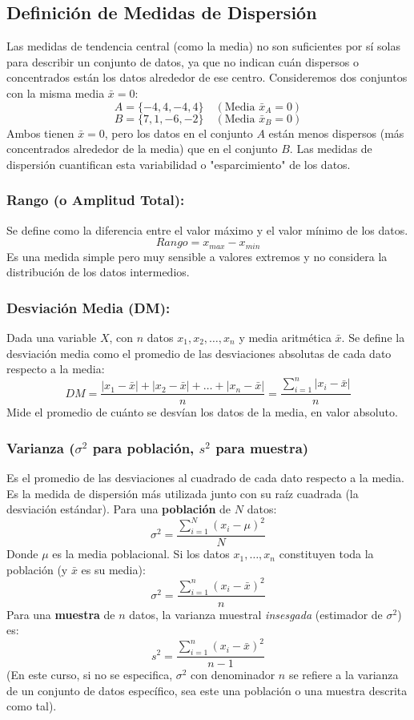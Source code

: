\documentclass[12pt, letterpaper]{article}
\begin{document}
\subsection{Definición de Medidas de Dispersión}
Las medidas de tendencia central (como la media) no son suficientes por sí solas para describir un conjunto de datos, ya que no indican cuán dispersos o concentrados están los datos alrededor de ese centro. Consideremos dos conjuntos con la misma media $\bar{x}=0$:
\[ A = \{-4, 4, -4, 4\} \quad (\text{Media } \bar{x}_A = 0) \]
\[ B = \{7, 1, -6, -2\} \quad (\text{Media } \bar{x}_B = 0) \]
Ambos tienen $\bar{x}=0$, pero los datos en el conjunto $A$ están menos dispersos (más concentrados alrededor de la media) que en el conjunto $B$. Las medidas de dispersión cuantifican esta variabilidad o "esparcimiento" de los datos.

\subsubsection{Rango (o Amplitud Total):}
Se define como la diferencia entre el valor máximo y el valor mínimo de los datos.
\[ Rango = x_{max} - x_{min} \]
Es una medida simple pero muy sensible a valores extremos y no considera la distribución de los datos intermedios.

\subsubsection{Desviación Media (DM):}
Dada una variable $X$, con $n$ datos $x_1, x_2, \dots, x_n$ y media aritmética $\bar{x}$. Se define la desviación media como el promedio de las desviaciones absolutas de cada dato respecto a la media:
\[ DM = \frac{|x_1-\bar{x}|+|x_2-\bar{x}|+\dots+|x_n-\bar{x}|}{n} = \frac{\sum_{i=1}^{n} |x_i - \bar{x}|}{n} \]
Mide el promedio de cuánto se desvían los datos de la media, en valor absoluto.

\subsubsection{\texorpdfstring{Varianza ($\sigma^2$ para población, $s^2$ para muestra)}{Varianza (sigma-cuadrado para población, s-cuadrado para muestra)}}
Es el promedio de las desviaciones al cuadrado de cada dato respecto a la media. Es la medida de dispersión más utilizada junto con su raíz cuadrada (la desviación estándar).
Para una \textbf{población} de $N$ datos:
\[ \sigma^2 = \frac{\sum_{i=1}^{N} (x_i - \mu)^2}{N} \]
Donde $\mu$ es la media poblacional. Si los datos $x_1, \dots, x_n$ constituyen toda la población (y $\bar{x}$ es su media):
\[ \sigma^2 = \frac{\sum_{i=1}^{n} (x_i - \bar{x})^2}{n} \]
Para una \textbf{muestra} de $n$ datos, la varianza muestral \textit{insesgada} (estimador de $\sigma^2$) es:
\[ s^2 = \frac{\sum_{i=1}^{n} (x_i - \bar{x})^2}{n-1} \]
(En este curso, si no se especifica, $\sigma^2$ con denominador $n$ se refiere a la varianza de un conjunto de datos específico, sea este una población o una muestra descrita como tal).
\end{document}

